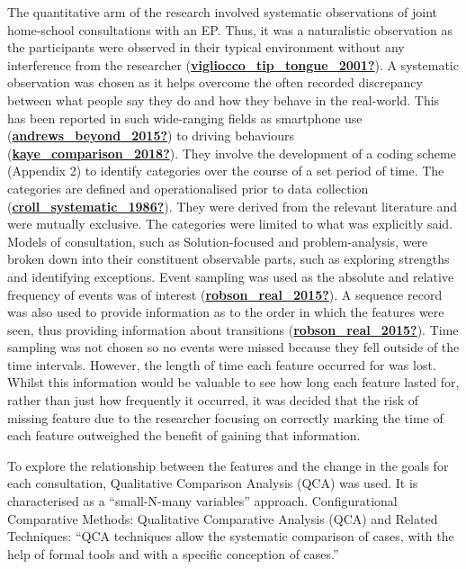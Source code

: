 \documentclass[
]{article}
\begin{document}
The quantitative arm of the research involved systematic observations of
joint home-school consultations with an EP. Thus, it was a naturalistic
observation as the participants were observed in their typical
environment without any interference from the researcher
(\protect\hyperlink{ref-vigliocco_tip_tongue_2001}{\textbf{vigliocco\_tip\_tongue\_2001?}}).
A systematic observation was chosen as it helps overcome the often
recorded discrepancy between what people say they do and how they behave
in the real-world. This has been reported in such wide-ranging fields as
smartphone use
(\protect\hyperlink{ref-andrews_beyond_2015}{\textbf{andrews\_beyond\_2015?}})
to driving behaviours
(\protect\hyperlink{ref-kaye_comparison_2018}{\textbf{kaye\_comparison\_2018?}}).
They involve the development of a coding scheme (Appendix 2) to identify
categories over the course of a set period of time. The categories are
defined and operationalised prior to data collection
(\protect\hyperlink{ref-croll_systematic_1986}{\textbf{croll\_systematic\_1986?}}).
They were derived from the relevant literature and were mutually
exclusive. The categories were limited to what was explicitly said.
Models of consultation, such as Solution-focused and problem-analysis,
were broken down into their constituent observable parts, such as
exploring strengths and identifying exceptions. Event sampling was used
as the absolute and relative frequency of events was of interest
(\protect\hyperlink{ref-robson_real_2015}{\textbf{robson\_real\_2015?}}).
A sequence record was also used to provide information as to the order
in which the features were seen, thus providing information about
transitions
(\protect\hyperlink{ref-robson_real_2015}{\textbf{robson\_real\_2015?}}).
Time sampling was not chosen so no events were missed because they fell
outside of the time intervals. However, the length of time each feature
occurred for was lost. Whilst this information would be valuable to see
how long each feature lasted for, rather than just how frequently it
occurred, it was decided that the risk of missing feature due to the
researcher focusing on correctly marking the time of each feature
outweighed the benefit of gaining that information.

To explore the relationship between the features and the change in the
goals for each consultation, Qualitative Comparison Analysis (QCA) was
used. It is characterised as a ``small-N-many variables'' approach.
Configurational Comparative Methods: Qualitative Comparative Analysis
(QCA) and Related Techniques: ``QCA techniques allow the systematic
comparison of cases, with the help of formal tools and with a specific
conception of cases.''
\end{document}
